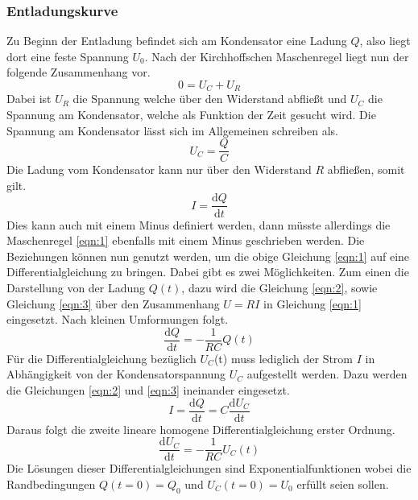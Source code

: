 \subsubsection{Entladungskurve}
Zu Beginn der Entladung befindet sich am Kondensator eine Ladung $Q$, also liegt dort eine feste Spannung $U_{0}$. 
Nach der Kirchhoffschen Maschenregel liegt nun der folgende Zusammenhang vor.
\begin{equation}
\label{eqn:1}
    0 = U_{C} + U_{R}
\end{equation}
Dabei ist $U_{R}$ die Spannung welche über den Widerstand abfließt und $U_{C}$ die Spannung am Kondensator, welche als Funktion der Zeit gesucht wird. 
Die Spannung am Kondensator lässt sich im Allgemeinen schreiben als.
\begin{equation}
\label{eqn:2}
    U_{C} = \frac{Q}{C}
\end{equation}
Die Ladung vom Kondensator kann nur über den Widerstand $R$ abfließen, somit gilt.
\begin{equation}
\label{eqn:3}
    I = \frac{\text{d}Q}{\text{d}t}
\end{equation}
Dies kann auch mit einem Minus definiert werden, dann müsste allerdings die Maschenregel \eqref{eqn:1} ebenfalls mit einem Minus geschrieben werden.
Die Beziehungen können nun genutzt werden, um die obige Gleichung \eqref{eqn:1} auf eine Differentialgleichung zu bringen. Dabei gibt es zwei Möglichkeiten. Zum einen die Darstellung von der Ladung $Q(t)$, dazu wird die Gleichung \eqref{eqn:2}, sowie Gleichung \eqref{eqn:3} über den Zusammenhang $U = RI$ in Gleichung \eqref{eqn:1} eingesetzt. Nach kleinen Umformungen folgt.
\begin{equation*}
    \frac{\text{d}Q}{\text{d}t} = - \frac{1}{RC} Q(t)
\end{equation*}
Für die Differentialgleichung bezüglich $U_{C}$(t) muss lediglich der Strom $I$ in Abhängigkeit von der Kondensatorspannung $U_{C}$ aufgestellt werden. Dazu werden die Gleichungen \eqref{eqn:2} und \eqref{eqn:3} ineinander eingesetzt.
\begin{equation*}
    I = \frac{\text{d}Q}{\text{d}t} = C \frac{\text{d}U_{C}}{\text{d}t}
\end{equation*}
Daraus folgt die zweite lineare homogene Differentialgleichung erster Ordnung.
\begin{equation*}
    \frac{\text{d}U_{C}}{\text{d}t} = - \frac{1}{RC} U_{C}(t)
\end{equation*}
Die Lösungen dieser Differentialgleichungen sind Exponentialfunktionen wobei die Randbedingungen $Q(t=0) = Q_{0}$ und $U_{C}(t=0) = U_{0}$ erfüllt seien sollen.
